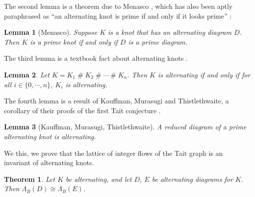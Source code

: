 \documentclass[12pt]{report}
\newcommand{\hash}{\ensuremath{\mathbin{\#}}}
\newtheorem*{theorem}{Theorem}
\newtheorem*{lemma}{Lemma}
\theoremstyle{upright}
\begin{document}
The second lemma is a theorem due to Menasco \cite{closed-incompressible-surfaces}, which has also been aptly paraphrased as ``an alternating knot is prime if and only if it looks prime'' \cite{the-first-two-million-knots}:

\begin{lemma}[Menasco]
	Suppose $K$ is a knot that has an alternating diagram $D$. Then $K$ is a prime knot if and only if $D$ is a prime diagram.
\end{lemma}

The third lemma is a textbook fact about alternating knots \cite{introduction-knot-theory}.

\begin{lemma}
	Let $K = K_{1} \hash K_{2} \hash \cdots \hash K_{n}$. Then $K$ is alternating if and only if for all $i \in \{0, \cdots, n\}$, $K_{i}$ is alternating.
\end{lemma}

The fourth lemma is a result of Kauffman, Murasugi and Thistlethwaite, a corollary of their proofs of the first Tait conjecture \cite{state-models-jones-polynomial, jones-polynomials-classical-conjectures, spanning-tree-expansion-jones-polynomial}.

\begin{lemma}[Kauffman, Murasugi, Thistlethwaite]
	A reduced diagram of a prime alternating knot is alternating.
\end{lemma}

We this, we prove that the lattice of integer flows of the Tait graph is an invariant of alternating knots.

\begin{theorem}
	Let $K$ be alternating, and let $D$, $E$ be alternating diagrams for $K$. Then $\Lambda_{B}(D) \cong \Lambda_{B}(E)$.
\end{theorem}
\end{document}
